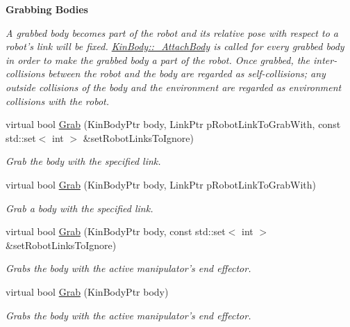 \begin{Indent}{\bf Grabbing Bodies}\par
{\em \label{_amgrpd50fc6ccc37aa4de8c2f9c816753d58c}
 A grabbed body becomes part of the robot and its relative pose with respect to a robot's link will be fixed. \hyperlink{classOpenRAVE_1_1KinBody_a1a340c6aa418a10fcf9847474376b1ba}{KinBody::\_\-AttachBody} is called for every grabbed body in order to make the grabbed body a part of the robot. Once grabbed, the inter-\/collisions between the robot and the body are regarded as self-\/collisions; any outside collisions of the body and the environment are regarded as environment collisions with the robot. }\begin{DoxyCompactItemize}
\item 
virtual bool \hyperlink{classOpenRAVE_1_1RobotBase_abd0375cf84ce804abe302d3e6faddf76}{Grab} (KinBodyPtr body, LinkPtr pRobotLinkToGrabWith, const std::set$<$ int $>$ \&setRobotLinksToIgnore)
\begin{DoxyCompactList}\small\item\em Grab the body with the specified link. \item\end{DoxyCompactList}\item 
virtual bool \hyperlink{classOpenRAVE_1_1RobotBase_a52c7267f79b4d09c583fce816a8a31df}{Grab} (KinBodyPtr body, LinkPtr pRobotLinkToGrabWith)
\begin{DoxyCompactList}\small\item\em Grab a body with the specified link. \item\end{DoxyCompactList}\item 
virtual bool \hyperlink{classOpenRAVE_1_1RobotBase_a922b8a6c3e70c59f28eb327b3c7f71f8}{Grab} (KinBodyPtr body, const std::set$<$ int $>$ \&setRobotLinksToIgnore)
\begin{DoxyCompactList}\small\item\em Grabs the body with the active manipulator's end effector. \item\end{DoxyCompactList}\item 
virtual bool \hyperlink{classOpenRAVE_1_1RobotBase_a233feb0353ba90cb2e60fea75043f364}{Grab} (KinBodyPtr body)
\begin{DoxyCompactList}\small\item\em Grabs the body with the active manipulator's end effector. \item\end{DoxyCompactList}\item 

\end{DoxyCompactItemize}
\end{Indent}
